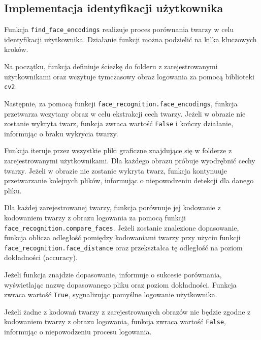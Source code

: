 \documentclass{report}
\begin{document}
%

\subsection{\Large Implementacja identyfikacji użytkownika}

Funkcja \texttt{find\_face\_encodings} realizuje proces porównania twarzy w celu identyfikacji użytkownika. Działanie funkcji można podzielić na kilka kluczowych kroków.

Na początku, funkcja definiuje ścieżkę do folderu z zarejestrowanymi użytkownikami oraz wczytuje tymczasowy obraz logowania za pomocą biblioteki \texttt{cv2}. 

Następnie, za pomocą funkcji \texttt{face\_recognition.face\_encodings}, funkcja przetwarza wczytany obraz w celu ekstrakcji cech twarzy. Jeżeli w obrazie nie zostanie wykryta twarz, funkcja zwraca wartość \texttt{False} i kończy działanie, informując o braku wykrycia twarzy.

Funkcja iteruje przez wszystkie pliki graficzne znajdujące się w folderze z zarejestrowanymi użytkownikami. Dla każdego obrazu próbuje wyodrębnić cechy twarzy. Jeżeli w obrazie nie zostanie wykryta twarz, funkcja kontynuuje przetwarzanie kolejnych plików, informując o niepowodzeniu detekcji dla danego pliku.

Dla każdej zarejestrowanej twarzy, funkcja porównuje jej kodowanie z kodowaniem twarzy z obrazu logowania za pomocą funkcji \texttt{face\_recognition.compare\_faces}. Jeżeli zostanie znalezione dopasowanie, funkcja oblicza odległość pomiędzy kodowaniami twarzy przy użyciu funkcji \newline \texttt{face\_recognition.face\_distance} oraz przekształca tę odległość na poziom dokładności (accuracy).

Jeżeli funkcja znajdzie dopasowanie, informuje o sukcesie porównania, wyświetlając nazwę dopasowanego pliku oraz poziom dokładności. Funkcja zwraca wartość \texttt{True}, sygnalizując pomyślne logowanie użytkownika. 

Jeżeli żadne z kodowań twarzy z zarejestrowanych obrazów nie będzie zgodne z kodowaniem twarzy z obrazu logowania, funkcja zwraca wartość \texttt{False}, informując o niepowodzeniu procesu logowania.
\end{document}

